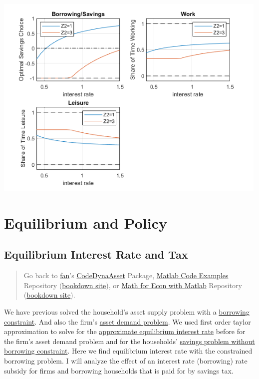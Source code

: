 \documentclass[
]{book}
\begin{document}
\includegraphics[width=5.20833in,height=\textheight]{img/household_asset_labor_constrained_images/figure_1.png}

\hypertarget{equilibrium-and-policy}{%
\chapter{Equilibrium and Policy}\label{equilibrium-and-policy}}

\hypertarget{equilibrium-interest-rate-and-tax}{%
\section{Equilibrium Interest Rate and Tax}\label{equilibrium-interest-rate-and-tax}}

\begin{quote}
Go back to \href{http://fanwangecon.github.io/}{fan}'s \href{https://fanwangecon.github.io/CodeDynaAsset/}{CodeDynaAsset} Package, \href{https://fanwangecon.github.io/M4Econ/}{Matlab Code Examples} Repository (\href{https://fanwangecon.github.io/M4Econ/bookdown}{bookdown site}), or \href{https://fanwangecon.github.io/Math4Econ/}{Math for Econ with Matlab} Repository (\href{https://fanwangecon.github.io/Math4Econ/bookdown}{bookdown site}).
\end{quote}

We have previous solved the household's asset supply problem with a
\href{https://fanwangecon.github.io/Math4Econ/optimization_application/household_borrow_constrained.html}{borrowing
constraint}.
And also the firm's \href{https://fanwangecon.github.io/Math4Econ/derivative_application/K_borrow_firm.html}{asset demand
problem}.
We used first order taylor approximation to solve for the \href{https://fanwangecon.github.io/Math4Econ/matrix_application/demand_supply_taylor_approximate_capital.html}{approximate
equilibrium interest
rate}
before for the firm's asset demand problem and for the households'
\href{https://fanwangecon.github.io/Math4Econ/derivative_application/K_save_households.html}{savings problem without borrowing
constraint}.
Here we find equilibrium interest rate with the constrained borrowing
problem. I will analyze the effect of an interest rate (borrowing) rate
subsidy for firms and borrowing households that is paid for by savings
tax.
\end{document}
